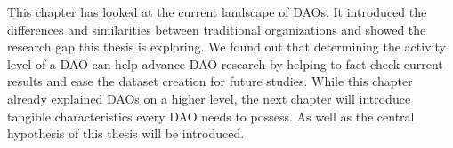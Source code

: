 This chapter has looked at the current landscape of DAOs. It introduced the differences and similarities between traditional organizations and showed the research gap this thesis is exploring. We found out that determining the activity level of a DAO can help advance DAO research by helping to fact-check current results and ease the dataset creation for future studies.
While this chapter already explained DAOs on a higher level, the next chapter will introduce tangible characteristics every DAO needs to possess. As well as the central hypothesis of this thesis will be introduced.

